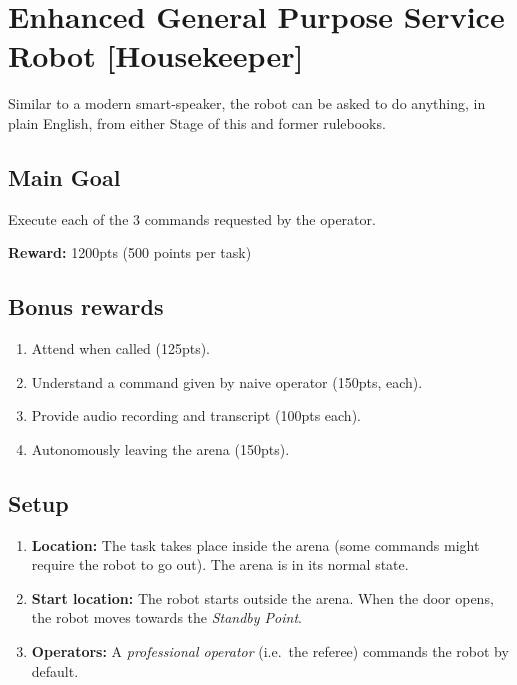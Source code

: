 \section{Enhanced General Purpose Service Robot [Housekeeper]}
Similar to a modern smart-speaker, the robot can be asked to do anything, in plain English, from either Stage of this and former rulebooks.


\subsection*{Main Goal}
Execute each of the 3 commands requested by the operator.

\noindent\textbf{Reward:} 1200pts (500 points per task)\\

\subsection*{Bonus rewards}
\begin{enumerate}[nosep]
	\item Attend when called (125pts).
	\item Understand a command given by naive operator (150pts, each).
	\item Provide audio recording and transcript (100pts each).
	\item Autonomously leaving the arena (150pts).
\end{enumerate}

%
%
\subsection*{Setup}
\begin{enumerate}
	\item \textbf{Location:} The task takes place inside the arena (some commands might require the robot to go out). The arena is in its normal state.

	\item \textbf{Start location:} The robot starts outside the arena. When the door opens, the robot moves towards the \textit{Standby Point}.

	\item \textbf{Operators:} A \emph{professional operator} (i.e.~the referee) commands the robot by default.
\end{enumerate}

